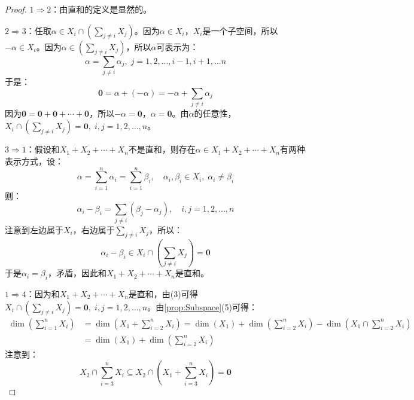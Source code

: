 \begin{proof}
	$1\Rightarrow2$：由直和的定义是显然的。\par
	$2\Rightarrow3$：任取$\alpha\in X_i\cap\left(\sum\limits_{j\ne i}X_j\right)$。因为$\alpha\in X_i$，$X_i$是一个子空间，所以$-\alpha\in X_i$。因为$\alpha\in\left(\sum\limits_{j\ne i}X_j\right)$，所以$\alpha$可表示为：
	\begin{equation*}
		\alpha=\sum_{j\ne i}\alpha_j,\;j=1,2,\dots,i-1,i+1,\dots n
	\end{equation*}
	于是：
	\begin{equation*}
		\mathbf{0}=\alpha+(-\alpha)=-\alpha+\sum_{j\ne i}\alpha_j
	\end{equation*}
	因为$\mathbf{0}=\mathbf{0}+\mathbf{0}+\cdots+\mathbf{0}$，所以$-\alpha=\mathbf{0}$，$\alpha=\mathbf{0}$。由$\alpha$的任意性，$X_i\cap\left(\sum\limits_{j\ne i}X_j\right)=\mathbf{0},\;i,j=1,2,\dots,n$。\par
	$3\Rightarrow1$：假设和$X_1+X_2+\cdots+X_n$不是直和，则存在$\alpha\in X_1+X_2+\cdots+X_n$有两种表示方式，设：
	\begin{equation*}
		\alpha=\sum_{i=1}^{n}\alpha_i=\sum_{i=1}^{n}\beta_i,\quad
		\alpha_i,\beta_i\in X_i,\;\alpha_i\ne\beta_i
	\end{equation*}
	则：
	\begin{equation*}
		\alpha_i-\beta_i=\sum_{j\ne i}(\beta_j-\alpha_j),\quad i,j=1,2,\dots,n
	\end{equation*}
	注意到左边属于$X_i$，右边属于$\sum\limits_{j\ne i}X_j$，所以：
	\begin{equation*}
		\alpha_i-\beta_i\in X_i\cap\left(\sum\limits_{j\ne i}X_j\right)=\mathbf{0}
	\end{equation*}
	于是$\alpha_i=\beta_i$，矛盾，因此和$X_1+X_2+\cdots+X_n$是直和。\par
	$1\Rightarrow4$：因为和$X_1+X_2+\cdots+X_n$是直和，由(3)可得$X_i\cap\left(\sum\limits_{j\ne i}X_j\right)=\mathbf{0},\;i,j=1,2,\dots,n$。由\cref{prop:Subspace}(5)可得：
	\begin{align*}
		\dim\left(\sum_{i=1}^{n}X_i\right)
		&=\dim\left(X_1+\sum_{i=2}^{n}X_i\right)
		=\dim(X_1)+\dim\left(\sum_{i=2}^{n}X_i\right)-\dim\left(X_1\cap\sum_{i=2}^{n}X_i\right) \\
		&=\dim(X_1)+\dim\left(\sum_{i=2}^{n}X_i\right)
	\end{align*}
	注意到：
	\begin{equation*}
		X_2\cap\sum_{i=3}^{n}X_i\subseteq X_2\cap\left(X_1+\sum_{i=3}^{n}X_i\right)=\mathbf{0}
	\end{equation*}

\end{proof}
